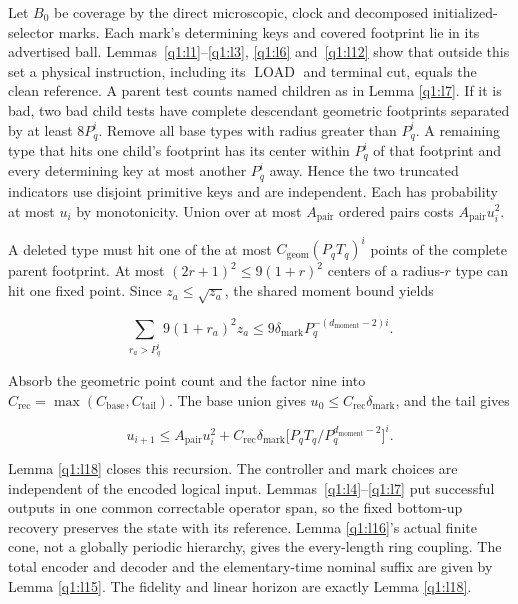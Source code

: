 Let \(B_{0}\) be coverage by the direct microscopic, clock and decomposed initialized-selector marks. Each mark's determining keys and covered footprint lie in its advertised ball. Lemmas~\ref{q1:l1}--\ref{q1:l3}, \ref{q1:l6} and~\ref{q1:l12} show that outside this set a physical instruction, including its \(\operatorname{LOAD}\) and terminal cut, equals the clean reference. A parent test counts named children as in Lemma \ref{q1:l7}. If it is bad, two bad child tests have complete descendant geometric footprints separated by at least \(8P_{q}^{i}\). Remove all base types with radius greater than \(P_{q}^{i}\). A remaining type that hits one child's footprint has its center within \(P_{q}^{i}\) of that footprint and every determining key at most another \(P_{q}^{i}\) away. Hence the two truncated indicators use disjoint primitive keys and are independent. Each has probability at most \(u_{i}\) by monotonicity. Union over at most \(A_{\mathrm{pair}}\) ordered pairs costs \(A_{\mathrm{pair}} u_{i}^{2}\).

A deleted type must hit one of the at most \(C_{\mathrm{geom}}(P_{q} T_{q})^{i}\) points of the complete parent footprint. At most \((2r+1)^{2}\le 9(1+r)^{2}\) centers of a radius-\(r\) type can hit one fixed point. Since \(z_{a}\le \sqrt{z_{a}}\), the shared moment bound yields

\[
\sum _{r_{a}>P_{q}^{i}} 9(1+r_{a})^{2} z_{a} \le 9 \delta_{\mathrm{mark}} P_{q}^{-(d_{\mathrm{moment}}-2)i}.
\]

Absorb the geometric point count and the factor nine into \(C_{\mathrm{rec}}=\max (C_{\mathrm{base}},C_{\mathrm{tail}})\). The base union gives \(u_{0}\le C_{\mathrm{rec}} \delta_{\mathrm{mark}}\), and the tail gives

\[
u_{i+1}\le A_{\mathrm{pair}} u_{i}^{2}+C_{\mathrm{rec}} \delta_{\mathrm{mark}} \bigl[P_{q} T_{q}/P_{q}^{d_{\mathrm{moment}}-2}\bigr]^{i}.
\]

Lemma \ref{q1:l18} closes this recursion. The controller and mark choices are independent of the encoded logical input. Lemmas~\ref{q1:l4}--\ref{q1:l7} put successful outputs in one common correctable operator span, so the fixed bottom-up recovery preserves the state with its reference. Lemma \ref{q1:l16}'s actual finite cone, not a globally periodic hierarchy, gives the every-length ring coupling. The total encoder and decoder and the elementary-time nominal suffix are given by Lemma \ref{q1:l15}. The fidelity and linear horizon are exactly Lemma \ref{q1:l18}.
